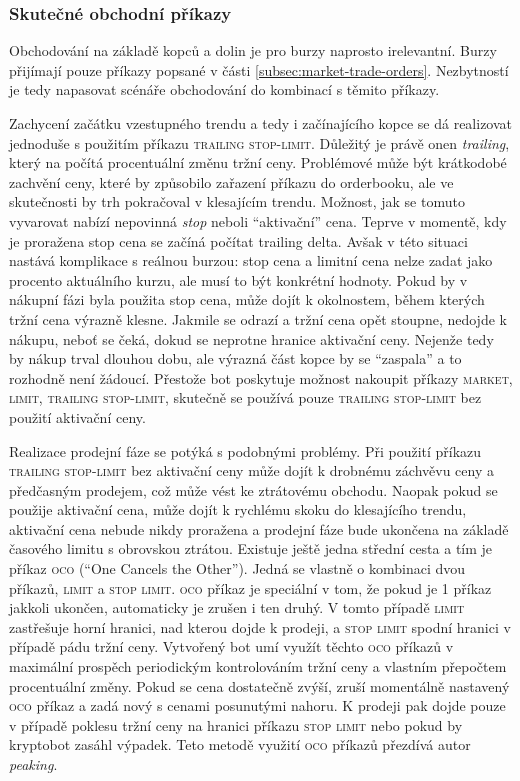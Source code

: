 \subsubsection{Skutečné obchodní příkazy}
Obchodování na základě kopců a dolin je pro burzy naprosto irelevantní. Burzy přijímají pouze příkazy popsané v části \ref{subsec:market-trade-orders}. Nezbytností je tedy napasovat scénáře
obchodování do kombinací s těmito příkazy.

Zachycení začátku vzestupného trendu a tedy i začínajícího kopce se dá realizovat jednoduše s použitím příkazu \textsc{trailing stop-limit}. Důležitý
je právě onen \emph{trailing}, který na počítá procentuální změnu tržní ceny. Problémové může být krátkodobé zachvění ceny, které by způsobilo zařazení příkazu do orderbooku, ale ve skutečnosti
by trh pokračoval v klesajícím trendu. Možnost, jak se tomuto vyvarovat nabízí nepovinná \emph{stop} neboli \enquote{aktivační} cena. Teprve v momentě, kdy je proražena stop cena se začíná počítat trailing
delta. Avšak v této situaci nastává komplikace s reálnou burzou: stop cena a limitní cena nelze zadat jako procento aktuálního kurzu, ale musí to být konkrétní hodnoty. Pokud by v nákupní fázi
byla použita stop cena, může dojít k okolnostem, během kterých tržní cena výrazně klesne. Jakmile se odrazí a tržní cena opět stoupne, nedojde k nákupu, neboť se čeká, dokud se neprotne hranice
aktivační ceny. Nejenže tedy by nákup trval dlouhou dobu, ale výrazná část kopce by se \enquote{zaspala} a to rozhodně není žádoucí. Přestože bot poskytuje možnost nakoupit příkazy \textsc{market,
    limit, trailing stop-limit}, skutečně se používá pouze \textsc{trailing stop-limit} bez použití aktivační ceny.

Realizace prodejní fáze se potýká s podobnými problémy. Při použití příkazu \textsc{trailing stop-limit} bez aktivační ceny může dojít k drobnému záchvěvu ceny a předčasným prodejem, což může
vést ke ztrátovému obchodu. Naopak pokud se použije aktivační cena, může dojít k rychlému skoku do klesajícího trendu, aktivační cena nebude nikdy proražena a prodejní fáze bude ukončena na základě
časového limitu s obrovskou ztrátou. Existuje ještě jedna střední cesta a tím je příkaz \textsc{oco} (\enquote{One Cancels the Other}). Jedná se vlastně o kombinaci dvou příkazů, \textsc{limit} a
\textsc{stop limit}. \textsc{oco} příkaz je speciální v tom, že pokud je 1 příkaz jakkoli ukončen, automaticky je zrušen i ten druhý. V tomto případě \textsc{limit} zastřešuje horní hranici, nad
kterou dojde k prodeji, a \textsc{stop limit} spodní hranici v případě pádu tržní ceny. Vytvořený bot umí využít těchto \textsc{oco} příkazů v maximální prospěch periodickým kontrolováním tržní ceny
a vlastním přepočtem procentuální změny. Pokud se cena dostatečně zvýší, zruší momentálně nastavený \textsc{oco} příkaz a zadá nový s cenami posunutými nahoru. K prodeji pak dojde pouze v případě poklesu tržní
ceny na hranici příkazu \textsc{stop limit} nebo pokud by kryptobot zasáhl výpadek. Teto metodě využití \textsc{oco} příkazů přezdívá autor \emph{peaking}.

